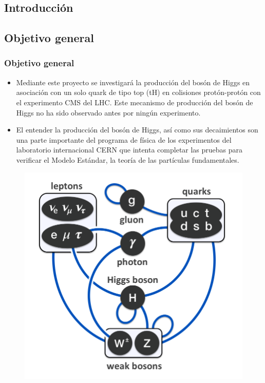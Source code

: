 \documentclass[11pt]{beamer}
\begin{document}
\begin{frame}
\section{Introducci\'on}
\subsection{Objetivo general}
\frametitle{Objetivo general}
\begin{itemize}
	\item Mediante este proyecto se investigará la producción del bosón de Higgs en asociación
	con un solo quark de tipo top (tH) en colisiones protón-protón con el experimento CMS
	del LHC. Este mecanismo de producción del bosón de Higgs no ha sido observado antes
	por ningún experimento.\\
	
	\item El entender la producción del bosón de Higgs, así como sus
	decaimientos son una parte importante del programa de física de los experimentos del
	laboratorio internacional CERN que intenta completar las pruebas para verificar el
	Modelo Estándar, la teoría de las partículas fundamentales.
\end{itemize}
\end{frame}

\begin{frame}
\begin{center}
	\begin{figure}[ht]
		\includegraphics[scale=0.24]{sm.png}
	\end{figure}
\end{center}
\end{frame}
\end{document}
